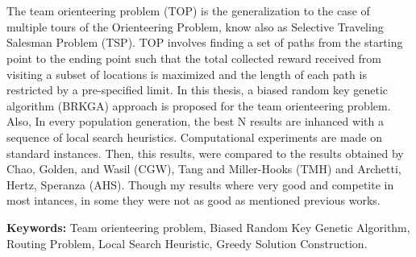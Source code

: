 \chapter*{\tituloAbstractEn}

\noindent The team orienteering problem (TOP) is the generalization to the case of multiple tours of the Orienteering Problem, know also as Selective Traveling Salesman Problem (TSP). TOP involves finding a set of paths from the starting point to the ending point such that the total collected reward received from visiting a subset of locations is maximized and the length of each path is restricted by a pre-specified limit. In this thesis, a biased random key genetic algorithm (BRKGA) approach is proposed for the team orienteering problem. Also, In every population generation, the best N results are inhanced with a sequence of local search heuristics. Computational experiments are made on standard instances. Then, this results, were compared to the results obtained by Chao, Golden, and Wasil (CGW), Tang and Miller-Hooks (TMH) and Archetti, Hertz, Speranza (AHS). Though my results where very good and competite in most intances, in some they were not as good as mentioned previous works.

\bigskip

\noindent\textbf{Keywords:} Team orienteering problem, Biased Random Key Genetic Algorithm, Routing Problem, Local Search Heuristic, Greedy Solution Construction.